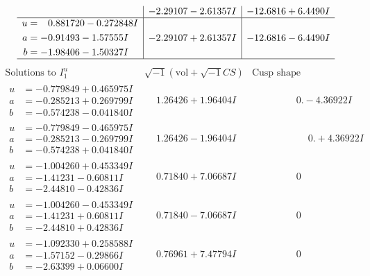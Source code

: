 \documentclass[1p]{elsarticle_modified}
\theoremstyle{definition}
\newcommand{\I}{\sqrt{-1}}
\begin{document}
$$\begin{array}{c|c|c}
 & -2.29107 - 2.61357 I & -12.6816 + 6.4490 I \\ \hline\begin{aligned}
u &= \phantom{-}0.881720 - 0.272848 I \\
a &= -0.91493 - 1.57555 I \\
b &= -1.98406 - 1.50327 I\end{aligned}
 & -2.29107 + 2.61357 I & -12.6816 - 6.4490 I\\
 \hline 
 \end{array}$$\newpage$$\begin{array}{c|c|c}  
\text{Solutions to }I^u_{1}& \I (\text{vol} + \sqrt{-1}CS) & \text{Cusp shape}\\
 \hline 
\begin{aligned}
u &= -0.779849 + 0.465975 I \\
a &= -0.285213 + 0.269799 I \\
b &= -0.574238 - 0.041840 I\end{aligned}
 & \phantom{-}1.26426 + 1.96404 I & \phantom{-0.000000 } 0. - 4.36922 I \\ \hline\begin{aligned}
u &= -0.779849 - 0.465975 I \\
a &= -0.285213 - 0.269799 I \\
b &= -0.574238 + 0.041840 I\end{aligned}
 & \phantom{-}1.26426 - 1.96404 I & \phantom{-0.000000 -}0. + 4.36922 I \\ \hline\begin{aligned}
u &= -1.004260 + 0.453349 I \\
a &= -1.41231 - 0.60811 I \\
b &= -2.44810 - 0.42836 I\end{aligned}
 & \phantom{-}0.71840 + 7.06687 I & \phantom{-0.000000 } 0 \\ \hline\begin{aligned}
u &= -1.004260 - 0.453349 I \\
a &= -1.41231 + 0.60811 I \\
b &= -2.44810 + 0.42836 I\end{aligned}
 & \phantom{-}0.71840 - 7.06687 I & \phantom{-0.000000 } 0 \\ \hline\begin{aligned}
u &= -1.092330 + 0.258588 I \\
a &= -1.57152 - 0.29866 I \\
b &= -2.63399 + 0.06600 I\end{aligned}
 & \phantom{-}0.76961 + 7.47794 I & \phantom{-0.000000 } 0 \\ \hline\begin{aligned}

\end{aligned}
\end{array}$$
\end{document}
